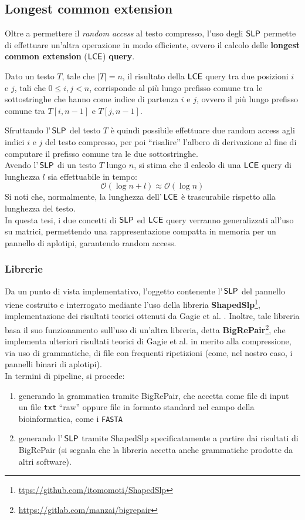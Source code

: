 \subsection{Longest common extension}
Oltre a permettere il \textit{random access} al testo compresso, 
l'uso degli $\mbox{\rm {\sf SLP}}$ permette di effettuare 
un'altra operazione in modo efficiente, ovvero il calcolo delle \textbf{longest
  common extension} ($\mbox{\rm {\sf LCE}}$) \textbf{query}.
\begin{definizione}
  Dato un testo $T$, tale che $|T|=n$, il risultato della $\mbox{\rm {\sf LCE}}$ query tra
  due posizioni $i$ e $j$, tali che $0\leq i,j<n$, corrisponde al più lungo
  prefisso comune tra le sottostringhe che hanno come indice di partenza $i$ e
  $j$, ovvero il più lungo prefisso comune tra $T[i,n-1]$ e $T[j,n-1]$.
\end{definizione}
Sfruttando l'$\,\mbox{\rm {\sf SLP}}$ del testo $T$ è quindi possibile effettuare due
random access agli indici $i$ e $j$ del testo compresso, per poi ``risalire''
l'albero di derivazione al fine di computare il prefisso comune tra le due
sottostringhe.\\ 
Avendo l'$\,\mbox{\rm {\sf SLP}}$ di un testo $T$ lungo $n$, si stima che il calcolo di una
$\mbox{\rm {\sf LCE}}$ query di lunghezza $l$ sia
effettuabile in tempo: 
\begin{equation}
  \label{eq:lcetime}
  \mathcal{O}\left(\log n+l\right)\approx\mathcal{O}\left(\log n\right)
\end{equation}
Si noti che, normalmente, la lunghezza dell'$\,\mbox{\rm {\sf LCE}}$ è trascurabile rispetto
alla lunghezza 
del testo.\\ 
In questa tesi, i due concetti di $\mbox{\rm {\sf SLP}}$ ed $\mbox{\rm {\sf LCE}}$ query verranno generalizzati
all'uso su matrici, permettendo una rappresentazione compatta in 
memoria per un pannello di aplotipi, garantendo random access.
\subsubsection{Librerie}
Da un punto di vista implementativo, l'oggetto contenente  l'$\,\mbox{\rm {\sf SLP}}$ del
pannello viene costruito e interrogato mediante l'uso della libreria
\textbf{ShapedSlp}\footnote{\url{ttps://github.com/itomomoti/ShapedSlp}},
implementazione dei risultati teorici ottenuti da 
Gagie et al. \cite{slpgagie}. Inoltre, tale libreria basa il suo funzionamento
sull'uso di un'altra libreria, detta
\textbf{BigRePair}\footnote{\url{https://gitlab.com/manzai/bigrepair}}, che 
implementa ulteriori risultati teorici di Gagie et al. \cite{rpair} in merito
alla compressione, via uso di grammatiche, di file con frequenti ripetizioni
(come, nel nostro caso, i pannelli binari di aplotipi).\\
In termini di pipeline, si procede:
\begin{enumerate}
  \item generando la grammatica tramite BigRePair, che accetta
  come file di input un file \texttt{txt} ``raw'' oppure file in formato
  standard nel campo della bioinformatica, come i \texttt{FASTA}
  \item generando l'$\,\mbox{\rm {\sf SLP}}$ tramite ShapedSlp specificatamente a
  partire dai risultati di BigRePair (si segnala che la libreria
  accetta anche grammatiche prodotte da altri software).
\end{enumerate}
